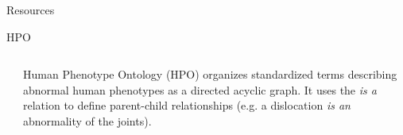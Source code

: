 \documentclass[final]{beamer} %
\begin{document}
\begin{frame}{}
\begin{columns}[T]
\begin{column}{0.3\linewidth}
\begin{block}{\Huge Resources}
    \begin{block}{\Large HPO}
   \begin{columns}[T]
      \begin{column}{.5\textwidth}
      \centering
      \vspace{1cm}
     \end{column}
     \begin{column}{.5\textwidth}
      \Large
      Human Phenotype Ontology (HPO) organizes standardized terms describing abnormal human phenotypes as a directed acyclic graph. It uses the  {\it{\Large is a}} relation to define parent-child relationships (e.g. a dislocation {\it{\Large is an}} abnormality of the joints).
     \end{column}
   \end{columns}
  \end{block}   


\end{block}
\end{column}
\end{columns}
\end{frame}
\end{document}
